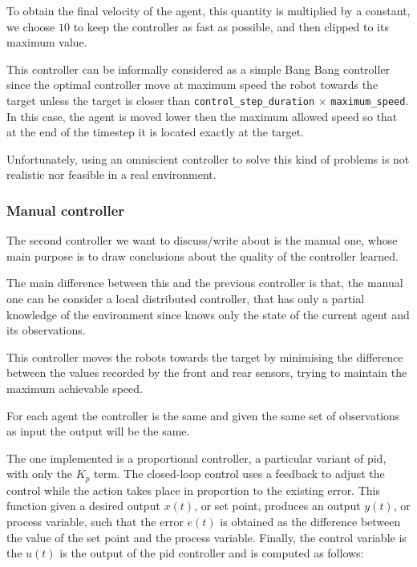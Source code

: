 \noindent
To obtain the final velocity of the agent, this quantity is multiplied by a constant, 
we choose $10$ to keep the controller as fast as possible, and then clipped to its 
maximum value.

This controller can be informally considered as a simple Bang Bang controller 
since the optimal controller move at maximum speed the robot towards the target 
unless the target is closer than %
\texttt{control\_step\_duration} $\times$ \texttt{maximum\_speed}. In this case, 
the agent is moved lower then the maximum allowed speed so that at the end of 
the timestep it is located exactly at the target.

Unfortunately, using an omniscient controller to solve this kind of problems is not 
realistic nor feasible in a real environment.

\subsubsection{Manual controller}
\label{subsubsec:manual}
The second controller we want to discuss/write about is the manual one, whose 
main purpose is to draw conclusions about the quality of the controller learned.

The main difference between this and the previous controller is that, the manual 
one can be consider a local distributed controller, that has only a partial 
knowledge of the environment since knows only the state of the current agent 
and its observations.

This controller moves the robots towards the target by minimising the difference 
between the values recorded by the front and rear sensors, trying to maintain the 
maximum achievable speed.

For each agent the controller is the same and given the same set of observations 
as input the output will be the same.

The one implemented is a proportional controller, a particular variant of \gls{pid}, 
with only the $K_p$ term. 
The closed-loop control uses a feedback to adjust the control while the action 
takes place in proportion to the existing error. This function given a desired 
output $x(t)$, or set point, produces an output $y(t)$, or process variable, such 
that the error $e(t)$ is obtained as the difference between the value of the set 
point and the process variable. Finally, the control variable is the $u(t)$ is the 
output of the \gls{pid} controller and is computed as follows:

